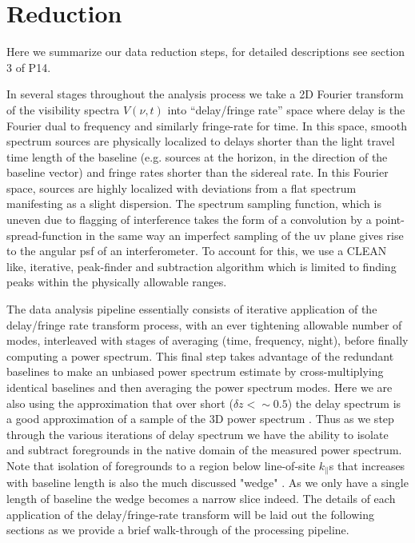 \documentclass[preprint]{aastex}
\begin{document}
\section{Reduction}
\label{sec:obs_meth}
Here we summarize our data reduction steps, for detailed descriptions see section 3 of P14.

In several stages throughout the analysis process we take a 2D Fourier transform of the visibility spectra $V(\nu,t)$ into ``delay/fringe rate'' space where delay is the Fourier dual to frequency and similarly fringe-rate for time.  In this space, smooth spectrum sources are physically localized to delays shorter than the light travel time length of the baseline (e.g. sources at the horizon, in the direction of the baseline vector) and fringe rates shorter than the sidereal rate.  In this Fourier space, sources are highly localized with deviations from a flat spectrum manifesting as a slight dispersion. The spectrum sampling function, which is uneven due to flagging of interference takes the form of a convolution by a point-spread-function in the same way an imperfect sampling of the uv plane gives rise to the angular psf of an interferometer.  To account for this, we use a CLEAN like, iterative, peak-finder and subtraction algorithm which is limited to finding peaks within the physically allowable ranges.

The data analysis pipeline essentially consists of iterative application of the delay/fringe rate transform process, with an ever tightening allowable number of modes, interleaved with stages of averaging (time, frequency, night), before finally computing a power spectrum.  This final step takes advantage of the redundant baselines to make an unbiased power spectrum estimate by cross-multiplying identical baselines and then averaging the power spectrum modes.  Here we are also using the approximation that over short ($\delta z < \sim 0.5$) the delay spectrum is a good approximation of a sample of the 3D power spectrum \citep{Parsons:2012p8896}.  Thus as we step through the various iterations of delay spectrum we have the ability to isolate and subtract foregrounds in the native domain of the measured power spectrum. Note that isolation of foregrounds to a region below line-of-site $k_\parallel$s that increases with baseline length is also the much discussed "wedge" \cite{Liu:2014p10462,Liu:2014p10463,Pober:2013p9942,Morales:2012p8790,Vedantham:2012p10297,Datta:2010p8781}. As we only have a single length of baseline the wedge becomes a narrow slice indeed.  The details of each application of the delay/fringe-rate transform will be laid out the following sections as we provide a brief walk-through of the processing pipeline. 
\end{document}
